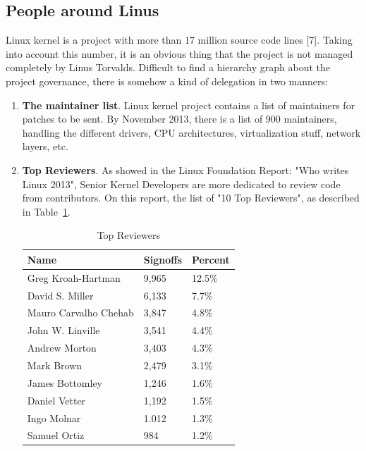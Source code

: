 \documentclass[11pt]{article}
\begin{document}
\subsection{People around Linus}
Linux kernel is a project with more than 17 million source code lines [7]. Taking into account this number, it is an obvious thing that the project is not managed completely by Linus Torvalds. Difficult to find a hierarchy graph about the project governance, there is somehow a kind of delegation in two manners:
\begin{enumerate}
\item{\textbf{The maintainer list}}. Linux kernel project contains a list of maintainers for patches to be sent. By November 2013, there is a list of 900 maintainers, handling the different drivers, CPU architectures, virtualization stuff, network layers, etc.
\item{\textbf{Top Reviewers}}. As showed in the Linux Foundation Report: "Who writes Linux 2013", Senior Kernel Developers are more dedicated to review code from contributors. On this report, the list of "10 Top Reviewers", as described in Table~\ref{tab:topreviewers}.
\begin{table}[H]
  \begin{center}
    \begin{tabular}{ | l | l | l | }
    \hline
    Name & Signoffs & Percent \\
    \hline
    Greg Kroah-Hartman    & 9,965 & 12.5\%\\
    David S. Miller       & 6,133 &  7.7\%\\ 
    Mauro Carvalho Chehab & 3,847 &  4.8\%\\
    John W. Linville      & 3,541 &  4.4\%\\
    Andrew Morton         & 3,403 &  4.3\%\\
    Mark Brown            & 2,479 &  3.1\%\\
    James Bottomley       & 1,246 &  1.6\%\\
    Daniel Vetter         & 1,192 &  1.5\%\\
    Ingo Molnar           & 1.012 &  1.3\%\\
    Samuel Ortiz          &   984 &  1.2\%\\
    \hline
    \end{tabular}
    \caption{Top Reviewers}
    \label{tab:topreviewers}
  \end{center}
\end{table}


\end{enumerate}
\end{document}
